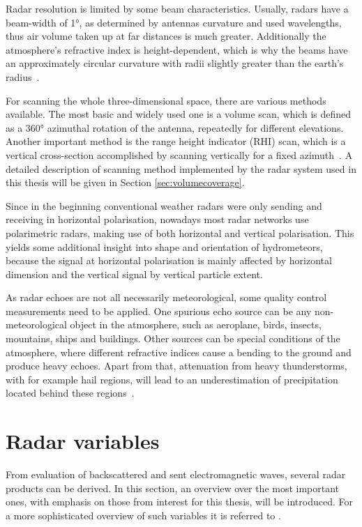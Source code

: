 Radar resolution is limited by some beam characteristics.
Usually, radars have a beam-width of 1°, as determined by antennas curvature and used wavelengths, thus air volume taken up at far distances is much greater. Additionally the atmosphere's refractive index is height-dependent, which is why the beams have an approximately circular curvature with radii slightly greater than the earth's radius~\cite[p. 18]{doviak_doppler_1993}.

For scanning the whole three-dimensional space, there are various methods available. The most basic and widely used one is a volume scan, which is defined as a 360° azimuthal rotation of the antenna, repeatedly for different elevations. Another important method is the range height indicator (RHI) scan, which is a vertical cross-section accomplished by scanning vertically for a fixed azimuth~\cite[p. 275]{fukao2014radar}. A detailed description of scanning method implemented by the radar system used in this thesis will be given in Section \ref{sec:volumecoverage}.

Since in the beginning conventional weather radars were only sending and receiving in horizontal polarisation, nowadays most radar networks use polarimetric radars, making use of both horizontal and vertical polarisation. This yields some additional insight into shape and orientation of hydrometeors, because the signal at horizontal polarisation is mainly affected by horizontal dimension and the vertical signal by vertical particle extent.

As radar echoes are not all necessarily meteorological, some quality control measurements need to be applied. One spurious echo source can be any non-meteorological object in the atmosphere, such as aeroplane, birds, insects, mountains, ships and buildings. Other sources can be special conditions of the atmosphere, where different refractive indices cause a bending to the ground and produce heavy echoes. Apart from that, attenuation from heavy thunderstorms, with for example hail regions, will lead to an underestimation of precipitation located behind these regions~\cite{radarqualitycontrol}.


\section{Radar variables}
From evaluation of backscattered and sent electromagnetic waves, several radar products can be derived. In this section, an overview over the most important ones, with emphasis on those from interest for this thesis, will be introduced. For a more sophisticated overview of such variables it is referred to \textcite{doviak_doppler_1993, Bringi2001, zhangWeatherPola, kumjian2013principles}.

